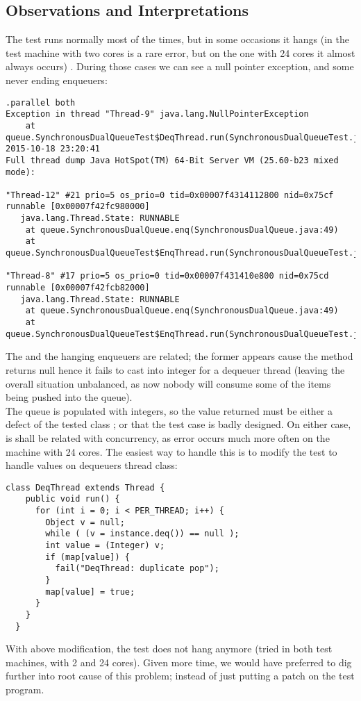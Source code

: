 \newpage
\subsection{Observations and Interpretations}
The test runs normally most of the times, but in some occasions it
hangs (in the test machine with two cores is a rare error, but on the
one with 24 cores it almost always occurs) . During those cases we can
see a null pointer exception, and some never ending enqueuers:

\begin{verbatim}
.parallel both
Exception in thread "Thread-9" java.lang.NullPointerException
	at queue.SynchronousDualQueueTest$DeqThread.run(SynchronousDualQueueTest.java:67)
2015-10-18 23:20:41
Full thread dump Java HotSpot(TM) 64-Bit Server VM (25.60-b23 mixed mode):

"Thread-12" #21 prio=5 os_prio=0 tid=0x00007f4314112800 nid=0x75cf runnable [0x00007f42fc980000]
   java.lang.Thread.State: RUNNABLE
	at queue.SynchronousDualQueue.enq(SynchronousDualQueue.java:49)
	at queue.SynchronousDualQueueTest$EnqThread.run(SynchronousDualQueueTest.java:60)

"Thread-8" #17 prio=5 os_prio=0 tid=0x00007f431410e800 nid=0x75cd runnable [0x00007f42fcb82000]
   java.lang.Thread.State: RUNNABLE
	at queue.SynchronousDualQueue.enq(SynchronousDualQueue.java:49)
	at queue.SynchronousDualQueueTest$EnqThread.run(SynchronousDualQueueTest.java:60)
\end{verbatim}
\hfill

The  and the hanging enqueuers are related;
the former appears cause the  method returns null hence it
fails to cast into integer for a dequeuer thread (leaving the overall
situation unbalanced, as now nobody will consume some of the items
being pushed into the queue). \\

The queue is populated with integers, so the  value returned
must be either a defect of the tested class ;
or that the test case is badly designed. On either case, is shall be
related with concurrency, as error occurs much more often on the machine
with 24 cores. The easiest way to handle this is to modify the test to
handle  values on dequeuers thread class: \\

\newpage
\begin{lstlisting}[style=nonumbers]
  class DeqThread extends Thread {
    public void run() {
      for (int i = 0; i < PER_THREAD; i++) {
        Object v = null;
        while ( (v = instance.deq()) == null ); 
        int value = (Integer) v;
        if (map[value]) {
          fail("DeqThread: duplicate pop");
        }
        map[value] = true;
      }
    }
  }  
\end{lstlisting}
\hfill

With above modification, the test does not hang anymore (tried in both
test machines, with 2 and 24 cores). Given more time, we would have
preferred to dig further into root cause of this problem; instead of
just putting a patch on the test program.



